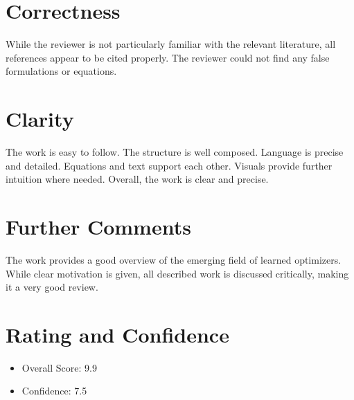 \documentclass[a4paper]{scrartcl}
\begin{document}
\section*{Correctness}
While the reviewer is not particularly familiar with the relevant literature, all references appear to be cited properly. The reviewer could not find any false formulations or equations.

\section*{Clarity}
The work is easy to follow. The structure is well composed. Language is precise and detailed. Equations and text support each other. Visuals provide further intuition where needed. Overall, the work is clear and precise.

\section*{Further Comments}
The work provides a good overview of the emerging field of learned optimizers. While clear motivation is given, all described work is discussed critically, making it a very good review.


\section*{Rating and Confidence}
\begin{itemize}
	\item Overall Score: 9.9
	\item Confidence: 7.5
\end{itemize}




	
\end{document}
